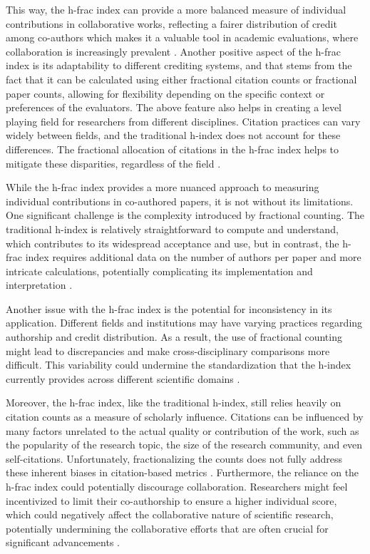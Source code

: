 This way, the h-frac index can provide a more balanced measure of individual
contributions in collaborative works, reflecting a fairer distribution of
credit among co-authors which makes it a valuable tool in academic evaluations,
where collaboration is increasingly prevalent
\cite{egghe2008mathematical,singhal2023analysis}. Another positive aspect of
the h-frac index is its adaptability to different crediting systems, and that
stems from the fact that it can be calculated using either fractional citation
counts or fractional paper counts, allowing for flexibility depending on the
specific context or preferences of the evaluators. The above feature also helps
in creating a level playing field for researchers from different disciplines.
Citation practices can vary widely between fields, and the traditional h-index
does not account for these differences. The fractional allocation of citations
in the h-frac index helps to mitigate these disparities, regardless of the
field \cite{singhal2023analysis}.

While the h-frac index provides a more nuanced approach to measuring individual
contributions in co-authored papers, it is not without its limitations. One
significant challenge is the complexity introduced by fractional counting. The
traditional h-index is relatively straightforward to compute and understand,
which contributes to its widespread acceptance and use, but in contrast, the
h-frac index requires additional data on the number of authors per paper and
more intricate calculations, potentially complicating its implementation and
interpretation \cite{egghe2008mathematical,singhal2023analysis}.

Another issue with the h-frac index is the potential for inconsistency in its
application. Different fields and institutions may have varying practices
regarding authorship and credit distribution. As a result, the use of
fractional counting might lead to discrepancies and make cross-disciplinary
comparisons more difficult. This variability could undermine the
standardization that the h-index currently provides across different scientific
domains \cite{egghe2008mathematical,singhal2023analysis}.

Moreover, the h-frac index, like the traditional h-index, still relies heavily
on citation counts as a measure of scholarly influence. Citations can be
influenced by many factors unrelated to the actual quality or contribution of
the work, such as the popularity of the research topic, the size of the
research community, and even self-citations. Unfortunately, fractionalizing the
counts does not fully address these inherent biases in citation-based metrics
\cite{egghe2008mathematical}. Furthermore, the reliance on the h-frac index
could potentially discourage collaboration. Researchers might feel incentivized
to limit their co-authorship to ensure a higher individual score, which could
negatively affect the collaborative nature of scientific research, potentially
undermining the collaborative efforts that are often crucial for significant
advancements \cite{singhal2023analysis}.

